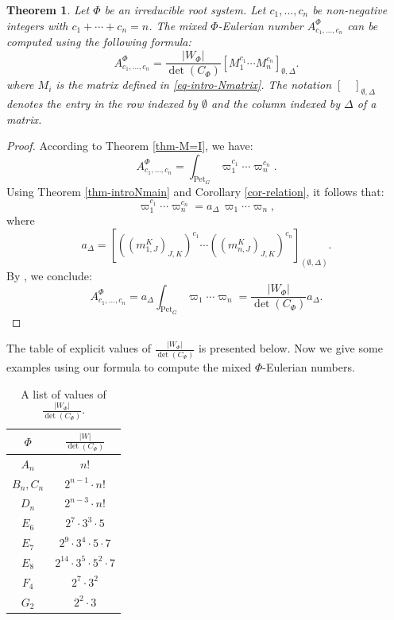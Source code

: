 \documentclass[11pt, letterpaper]{amsart}
\numberwithin{equation}{section}
\newtheorem{theorem}{Theorem}[section]
\DeclareMathOperator{\Pet}{Pet}
\begin{document}
\begin{theorem}\label{thm-MEN}
    Let \(\Phi\) be an irreducible root system. Let \(c_1, \ldots, c_n\) be non-negative integers with \(c_1 + \cdots + c_n = n\).  
The mixed ${\Phi}$-Eulerian number $A_{c_{1}, \ldots, c_{n}}^{\Phi}$ can be computed using the following formula:
\[
A_{c_{1},\ldots,c_{n}}^{\Phi} = \frac{|W_{\Phi}|}{\det(C_\Phi)} 
\left[ M_{1}^{c_{1}} \cdots M_{n} ^{c_{n}} \right]_{\emptyset, \Delta}.
\]
where $M_{i}$ is the matrix defined in \eqref{eq-intro-Nmatrix}.
The notation 
\(
[\quad]_{\emptyset, \Delta}
\)
denotes the entry in the row indexed by $\emptyset$ and the column indexed by $\Delta$ of a matrix.
\end{theorem}

\begin{proof}
According to Theorem \ref{thm-M=I}, we have:
\[
A_{c_{1},\ldots ,c_{n}}^{\Phi} = \int_{\Pet_{G}} \varpi_{1}^{c_{1}} \cdots \varpi_{n}^{c_{n}}.
\]
Using Theorem \ref{thm-introNmain} and Corollary \ref{cor-relation}, it follows that:
\[
\varpi_{1}^{c_{1}} \cdots \varpi_{n}^{c_{n}} = a_{\Delta} \, \varpi_{1} \cdots \varpi_{n},
\]
where 
\[
a_{\Delta}=\left[ \left( (m_{1,J}^{K})_{J,K} \right)^{c_{1}} \cdots \left( (m_{n,J}^{K})_{J,K} \right)^{c_{n}} \right]_{(\emptyset, \Delta)}.
\]
By \cite[Theorem 1.1.(3)]{Horiguchi2024mixed}, we conclude:
\[
A_{c_{1},\ldots, c_{n}}^{\Phi} = a_{\Delta} \int_{\Pet_{G}} \varpi_{1} \cdots \varpi_{n} = \frac{|W_{\Phi}|}{\det(C_\Phi)} a_{\Delta}.
\]
\end{proof}

The table of explicit values of $\frac{|W_{\Phi}|}{\det(C_{\Phi})}$ is presented below. Now we give some examples using our formula to compute the mixed $\Phi$-Eulerian numbers.

\begin{table}[htb]
  \begin{tabular}{|c|c|} \hline
    $\Phi$ & $\frac{|W|}{\det (C_{\Phi})}$ \\ \hline \hline
    $A_n$ & $n!$ \\ \hline
    $B_n,C_n$ & $2^{n-1} \cdot n!$ \\ \hline
    $D_n$ & $2^{n-3} \cdot n!$ \\ \hline
    $E_6$ & $2^{7} \cdot 3^{3} \cdot 5$ \\ \hline
    $E_7$ & $2^{9} \cdot 3^{4} \cdot 5 \cdot 7$ \\ \hline
    $E_8$ & $2^{14} \cdot 3^{5} \cdot 5^{2} \cdot 7$ \\ \hline
    $F_4$ & $2^{7} \cdot 3^{2}$ \\ \hline
    $G_2$ &  $2^{2} \cdot 3$ \\ \hline
  \end{tabular}
  \caption{A list of values of $\frac{|W_{\Phi}|}{\det (C_{\Phi})}$.}
\label{tab:A list of values mPhi}
\end{table}
\end{document}
